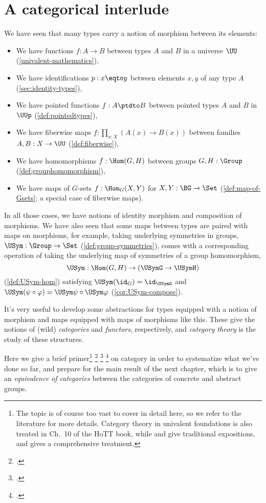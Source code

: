 \chapter{A categorical interlude}
\label{ch:cats}

We have seen that many types carry a notion of morphism between its elements:
\begin{itemize}
\item We have functions $f : A \to B$ between types $A$ and $B$ in a universe $\UU$
  (\cref{univalent-mathematics}),
\item We have identifications $p : x \eqto y$ between elements $x,y$ of any type $A$
  (\cref{sec:identity-types}),
\item We have pointed functions $f : A \ptdto B$ between pointed types $A$ and $B$ in $\UUp$
  (\cref{def:pointedtypes}),
\item We have fiberwise maps $f : \prod_{x:X}(A(x) \to B(x))$ between families $A,B : X \to \UU$ (\cref{def:fiberwise}),
\item We have homomorphisms $f : \Hom(G, H)$ between groups $G, H : \Group$
  (\cref{def:grouphomomorphism}),
\item We have maps of $G$-sets $f : \Hom_G(X,Y)$ for $X,Y : \BG \to \Set$
  (\cref{def:map-of-Gsets}; a special case of fiberwise maps).
\end{itemize}
In all those cases, we have notions of identity morphism and composition of morphisms.
We have also seen that some maps between types are paired with maps on morphisms, for example,
taking underlying symmetries in groups, $\USym : \Group \to \Set$ (\cref{def:group-symmetries}),
comes with a corresponding operation of taking the underlying map of symmetries of a group homomorphism,
\[ \USym : \Hom(G,H) \to (\USymG \to \USymH) \]
(\cref{def:USym-hom}) satisfying $\USym(\id_G) = \id_{\USymG}$ and $\USym(\psi\circ\varphi) = \USym\psi \circ \USym\varphi$ (\cref{cor:USym-compose}).

It's very useful to develop some abstractions for types equipped with a notion of morphism and maps equipped with maps of morphisms like this.
These give the notions of (wild) \emph{categories} and \emph{functors}, respectively,
and \emph{category theory} is the study of these structures.

Here we give a brief primer\footnote{%
  The topic is of course too vast to cover in detail here,
  so we refer to the literature for more details.
  Category theory in univalent foundations is also treated in
  Ch.~10 of the HoTT book\footnotemark{},
  while \citeauthor{AwodeyCat}\footnotemark{}
  and \citeauthor{RiehlContext}\footnotemark{}
  give traditional expositions,
  and \citeauthor{MacLaneWorking}\footnotemark{}
  gives a comprehensive treatment.}%
\footcitetext{hottbook}%
\footcitetext{RiehlContext}%
\footcitetext{AwodeyCat}
on category in order to systematize what we've done so far,
and prepare for the main result of the next chapter, which is to give an
\emph{equivalence of categories} between the categories of concrete and abstract groups.

